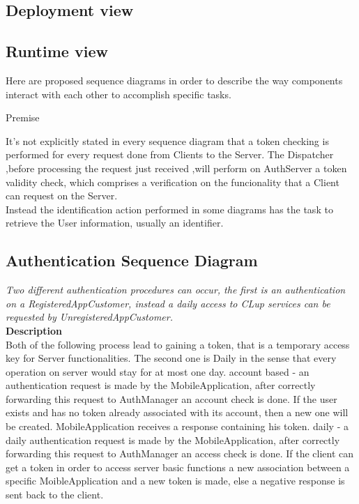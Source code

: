 \subsection{Deployment view}

\subsection{Runtime view}
Here are proposed sequence diagrams in order to describe the way components interact with each other to accomplish specific tasks.\\

\begin{center} 
Premise\\
\end{center}
It’s not explicitly stated in every sequence diagram that a token checking is performed for every request done from Clients to the Server. The Dispatcher ,before processing the request just received ,will perform on AuthServer a token validity check, which comprises a verification on the funcionality that a Client can request on the Server. \\ 
Instead the identification action performed in some diagrams has the task to retrieve the User information, usually an identifier.
\\

\newpage
\subsection{Authentication Sequence Diagram}
\textit{Two different authentication procedures can occur, the first is an authentication on a RegisteredAppCustomer, instead a daily access to CLup services can be requested by UnregisteredAppCustomer.\\}
\textbf{Description\\}
Both of the following process lead to gaining a token, that is a temporary access key for Server functionalities. The second one is Daily in the sense that every operation on server would stay for at most one day.
account based - an authentication request is made by the MobileApplication, after correctly forwarding this request to AuthManager an account check is done. If the user exists and has no token already associated with its account, then a new one will be created. MobileApplication receives a response containing his token. 
daily - a daily authentication request is made by the MobileApplication, after correctly forwarding this request to AuthManager an access check is done. If the client can get a token in order to access server basic functions a new association between a specific MoibleApplication and a new token is made, else a negative response is sent back to the client. \\

